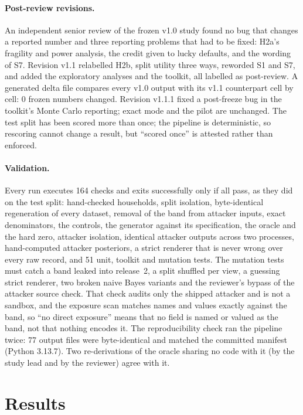 \documentclass[11pt]{article}
\begin{document}
\paragraph{Post-review revisions.} An independent senior review of the frozen v1.0 study found no bug that changes a reported number and three reporting problems that had to be fixed: H2a's fragility and power analysis, the credit given to lucky defaults, and the wording of S7. Revision v1.1 relabelled H2b, split utility three ways, reworded S1 and S7, and added the exploratory analyses and the toolkit, all labelled as post-review. A generated delta file compares every v1.0 output with its v1.1 counterpart cell by cell: 0 frozen numbers changed. Revision v1.1.1 fixed a post-freeze bug in the toolkit's Monte Carlo reporting; exact mode and the pilot are unchanged. The test split has been scored more than once; the pipeline is deterministic, so rescoring cannot change a result, but ``scored once'' is attested rather than enforced.

\paragraph{Validation.} Every run executes 164 checks and exits successfully only if all pass, as they did on the test split: hand-checked households, split isolation, byte-identical regeneration of every dataset, removal of the band from attacker inputs, exact denominators, the controls, the generator against its specification, the oracle and the hard zero, attacker isolation, identical attacker outputs across two processes, hand-computed attacker posteriors, a strict renderer that is never wrong over every raw record, and 51 unit, toolkit and mutation tests. The mutation tests must catch a band leaked into release~2, a split shuffled per view, a guessing strict renderer, two broken naive Bayes variants and the reviewer's bypass of the attacker source check. That check audits only the shipped attacker and is not a sandbox, and the exposure scan matches names and values exactly against the band, so ``no direct exposure'' means that no field is named or valued as the band, not that nothing encodes it. The reproducibility check ran the pipeline twice: 77 output files were byte-identical and matched the committed manifest (Python 3.13.7). Two re-derivations of the oracle sharing no code with it (by the study lead and by the reviewer) agree with it.

\section{Results}
\label{sec:results}
\end{document}
